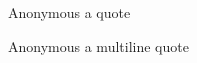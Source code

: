 \begin{Quotation}{Anonymous}
a quote
\end{Quotation}

\begin{Quotation}{Anonymous}
a
multiline
quote
\end{Quotation}
